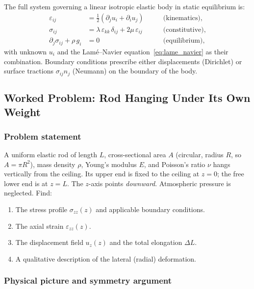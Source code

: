 The full system governing a linear isotropic elastic body in static equilibrium is:
\begin{align}
    \varepsilon_{ij} &= \tfrac{1}{2}(\partial_j u_i + \partial_i u_j) \qquad &\text{(kinematics)},\label{eq:system_kin}\\
    \sigma_{ij} &= \lambda\,\varepsilon_{kk}\,\delta_{ij} + 2\mu\,\varepsilon_{ij} \qquad &\text{(constitutive)},\label{eq:system_const}\\
    \partial_j\sigma_{ij} + \rho\, g_i &= 0 \qquad &\text{(equilibrium)},\label{eq:system_equil}
\end{align}
with unknown $u_i$ and the Lamé–Navier equation~\eqref{eq:lame_navier} as their combination. Boundary conditions prescribe either displacements (Dirichlet) or surface tractions $\sigma_{ij}n_j$ (Neumann) on the boundary of the body.

\subsection*{Worked Problem: Rod Hanging Under Its Own Weight}

\subsubsection*{Problem statement}

A uniform elastic rod of length $L$, cross-sectional area $A$ (circular, radius $R$, so $A = \pi R^2$), mass density $\rho$, Young's modulus $E$, and Poisson's ratio $\nu$ hangs vertically from the ceiling. Its upper end is fixed to the ceiling at $z=0$; the free lower end is at $z=L$. The $z$-axis points \emph{downward}. Atmospheric pressure is neglected. Find:
\begin{enumerate}[label=\textbf{(\alph*)}]
    \item The stress profile $\sigma_{zz}(z)$ and applicable boundary conditions.
    \item The axial strain $\varepsilon_{zz}(z)$.
    \item The displacement field $u_z(z)$ and the total elongation $\Delta L$.
    \item A qualitative description of the lateral (radial) deformation.
\end{enumerate}

\subsubsection*{Physical picture and symmetry argument}


